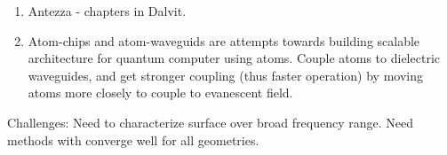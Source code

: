 \begin{enumerate}
\item Antezza - chapters in Dalvit.  
\item Atom-chips and atom-waveguids are attempts towards building scalable 
architecture for quantum computer using atoms.
Couple atoms to dielectric waveguides, and get stronger coupling (thus faster operation)
by moving atoms more closely to couple to evanescent field.  
\end{enumerate}
Challenges:  Need to characterize surface over broad frequency range.
Need methods with converge well for all geometries.  

